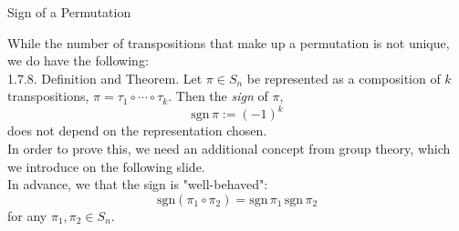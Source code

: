 \documentclass[smaller,hyperref={CJKbookmarks=true}]{beamer}
\begin{document}
\begin{frame}[t,shrink]{Sign of a Permutation}
\begin{spacing}{1.2}
While the number of transpositions that make up a permutation is not
unique, we do have the following:\\
\alert{1.7.8. Definition and Theorem.} Let $\pi\in S_n$ be represented as a composition of $k$ transpositions, $\pi=\tau_1\circ\cdots\circ\tau_k$. Then the \emph{sign} of $\pi$,
\[\text{sgn}\,\pi:=(-1)^k\]
does not depend on the representation chosen.\\
In order to prove this, we need an additional concept from group theory,
which we introduce on the following slide.\\
In advance, we that the sign is "well-behaved":
\[\text{sgn}(\pi_1\circ\pi_2)=\text{sgn}\,\pi_1\,\text{sgn}\,\pi_2\]
for any $\pi_1,\pi_2\in S_n$.
\end{spacing}
\end{frame}
\end{document}
